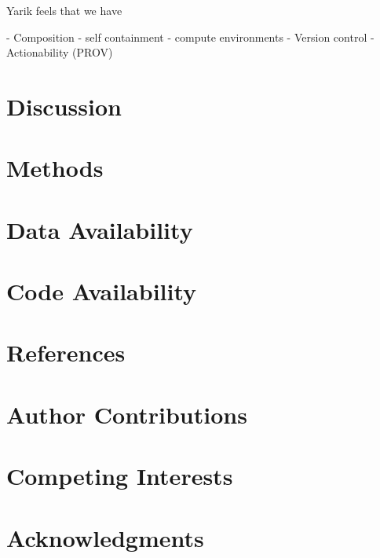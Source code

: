 \documentclass{article}
\begin{document}


Yarik feels that we have

- Composition
 - self containment
 - compute environments 
- Version control
- Actionability (PROV)

\section{Discussion}
\section{Methods}
\section{Data Availability}
\section{Code Availability}
\section{References}
\section{Author Contributions}
\section{Competing Interests}
\section{Acknowledgments}
\end{document}
